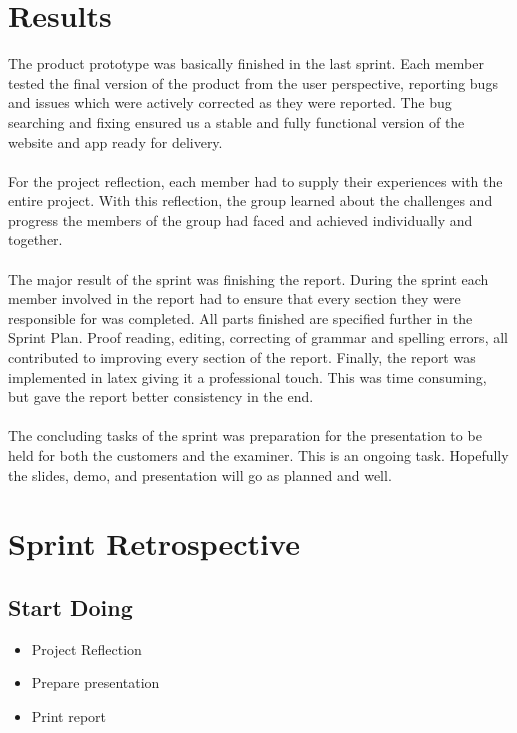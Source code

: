 \section{Results}
\label{sec:FinalResults}

The product prototype was basically finished in the last sprint. Each member tested the final version of the product from the user perspective, reporting bugs and issues which were actively corrected as they were reported. The bug searching and fixing ensured us a stable and fully functional version of the website and app ready for delivery. 

\paragraph{} For the project reflection, each member had to supply their experiences with the entire project. With this reflection, the group learned about the challenges and progress the members of the group had faced and achieved individually and together. 

\paragraph{} The major result of the sprint was finishing the report. During the sprint each member involved in the report had to ensure that every section they were responsible for was completed. All parts finished are specified further in the Sprint Plan. Proof reading, editing, correcting of grammar and spelling errors, all contributed to improving every section of the report. Finally, the report was implemented in latex giving it a professional touch. This was time consuming, but gave the report better consistency in the end. 

\paragraph{} The concluding tasks of the sprint was preparation for the presentation to be held for both the customers and the examiner. This is an ongoing task. Hopefully the slides, demo, and presentation will go as planned and well. 


\section{Sprint Retrospective}
\label{sec:FinalRetrospective}

\subsection{Start Doing}
\begin{itemize}
\item Project Reflection
\item Prepare presentation
\item Print report
\end{itemize}

